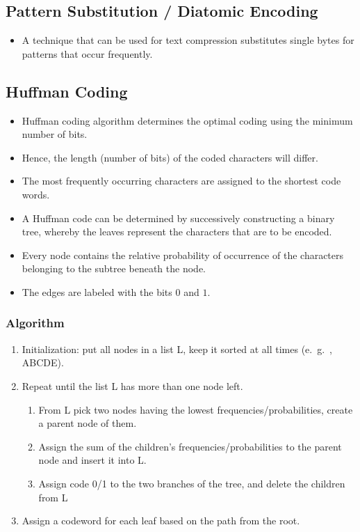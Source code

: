 \subsection{Pattern Substitution / Diatomic Encoding}
\begin{itemize}
	\item A technique that can be used for text compression substitutes single bytes for patterns that occur frequently. 
\end{itemize}


\subsection{Huffman Coding}
\begin{itemize}
	\item Huffman coding algorithm determines the optimal coding using the minimum number of bits. 
	\item Hence, the length (number of bits) of the coded characters will differ.
	\item The most frequently occurring characters are assigned to the shortest	code words. 
	\item A Huffman code can be determined by successively constructing a binary tree, whereby the leaves represent the characters that are to be encoded. 
	\item Every node contains the relative probability of occurrence of the characters belonging to the subtree beneath the node. 
	\item The edges are labeled with the bits $ 0 $ and $ 1 $.
\end{itemize}

\subsubsection*{Algorithm}
\begin{enumerate}
	\item Initialization: put all nodes in a list L, keep it sorted at all times (e.\ g.\ , ABCDE).
	\item Repeat until the list L has more than one node left.
	\begin{enumerate}[label=(\alph*)]
		\item From L pick two nodes having the lowest frequencies/probabilities, create a parent node of them.
		\item Assign the sum of the children’s frequencies/probabilities to the	parent node and insert it into L.
		\item Assign code 0/1 to the two branches of the tree, and delete the children from L
\end{enumerate}
\item Assign a codeword for each leaf based on the path from the root.
\end{enumerate}



